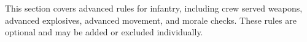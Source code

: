 This section covers advanced rules for infantry, including crew served weapons, advanced explosives, advanced movement, and morale checks.
These rules are optional and may be added or excluded individually.
